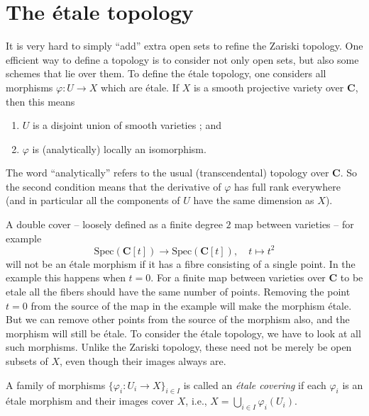 \section{The \'etale topology}
\label{section-etale-topology}

\noindent
It is very hard to simply ``add'' extra open sets to refine the Zariski
topology. One efficient way to define a topology is to consider not only open
sets, but also some schemes that lie over them. To define the \'etale topology,
one considers all morphisms $\varphi: U \to X$ which are \'etale. If
$X$ is a smooth projective variety over $\mathbf{C}$, then this means
\begin{enumerate}
\item $U$ is a disjoint union of smooth varieties ; and
\item $\varphi$ is (analytically) locally an isomorphism.
\end{enumerate}
The word ``analytically'' refers to the usual (transcendental) topology over
$\mathbf{C}$. So the second condition means that the derivative of $\varphi$
has full rank everywhere (and in particular all the components of $U$
have the same dimension as $X$).

\medskip\noindent
A double cover -- loosely defined as a finite degree $2$ map between varieties
-- for example
$$
\text{Spec}(\mathbf{C}[t])
\longrightarrow
\text{Spec}(\mathbf{C}[t]),
\quad t \longmapsto t^2
$$
will not be an \'etale morphism if it has a fibre consisting of a single point.
In the example this happens when $t = 0$. For a finite map between varieties
over $\mathbf{C}$ to be etale all the fibers should have the same number of
points. Removing the point $t = 0$ from the source of the map in the example
will make the morphism \'etale. But we can remove other points from the source
of the morphism also, and the morphism will still be \'etale.  To consider the
\'etale topology, we have to look at all such morphisms. Unlike the Zariski
topology, these need not be merely be open subsets of $X$, even though their
images always are.

\begin{definition}
\label{definition-etale-covering-initial}
A family of morphisms $\{ \varphi_i : U_i \to X\}_{i \in I}$ is
called an {\it \'etale covering} if each $\varphi_i$ is an \'etale morphism
and their images cover $X$, i.e.,
$X = \bigcup_{i \in I} \varphi_i(U_i)$.
\end{definition}

